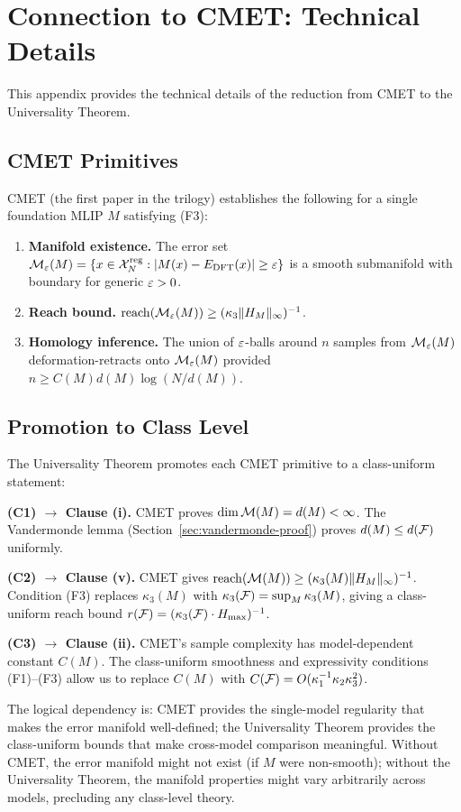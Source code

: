 \section{Connection to CMET: Technical Details}\label{app:cmet}

This appendix provides the technical details of the reduction from CMET to the Universality Theorem.

\subsection{CMET Primitives}

CMET (the first paper in the trilogy) establishes the following for a single foundation MLIP $M$ satisfying (F3):
\begin{enumerate}[label=(C\arabic*)]
    \item \textbf{Manifold existence.} The error set $\mathcal{M}_{\varepsilon}(M) = \{x \in \mathcal{X}_N^{\text{reg}} : |M(x) - E_{\text{DFT}}(x)| \geq \varepsilon\}$ is a smooth submanifold with boundary for generic $\varepsilon > 0$.
    \item \textbf{Reach bound.} $\mathrm{reach}(\mathcal{M}_{\varepsilon}(M)) \geq (\kappa_3 \|H_M\|_\infty)^{-1}$.
    \item \textbf{Homology inference.} The union of $\varepsilon$-balls around $n$ samples from $\mathcal{M}_{\varepsilon}(M)$ deformation-retracts onto $\mathcal{M}_{\varepsilon}(M)$ provided $n \geq C(M) d(M) \log(N/d(M))$.
\end{enumerate}

\subsection{Promotion to Class Level}

The Universality Theorem promotes each CMET primitive to a class-uniform statement:

\textbf{(C1) $\to$ Clause (i).} CMET proves $\dim \mathcal{M}(M) = d(M) < \infty$. The Vandermonde lemma (Section~\ref{sec:vandermonde-proof}) proves $d(M) \leq d(\mathcal{F})$ uniformly.

\textbf{(C2) $\to$ Clause (v).} CMET gives $\mathrm{reach}(\mathcal{M}(M)) \geq (\kappa_3(M) \|H_M\|_\infty)^{-1}$. Condition (F3) replaces $\kappa_3(M)$ with $\kappa_3(\mathcal{F}) = \sup_M \kappa_3(M)$, giving a class-uniform reach bound $r(\mathcal{F}) = (\kappa_3(\mathcal{F}) \cdot H_{\max})^{-1}$.

\textbf{(C3) $\to$ Clause (ii).} CMET's sample complexity has model-dependent constant $C(M)$. The class-uniform smoothness and expressivity conditions (F1)--(F3) allow us to replace $C(M)$ with $C(\mathcal{F}) = O(\kappa_1^{-1} \kappa_2 \kappa_3^2)$.

The logical dependency is: CMET provides the single-model regularity that makes the error manifold well-defined; the Universality Theorem provides the class-uniform bounds that make cross-model comparison meaningful. Without CMET, the error manifold might not exist (if $M$ were non-smooth); without the Universality Theorem, the manifold properties might vary arbitrarily across models, precluding any class-level theory.
